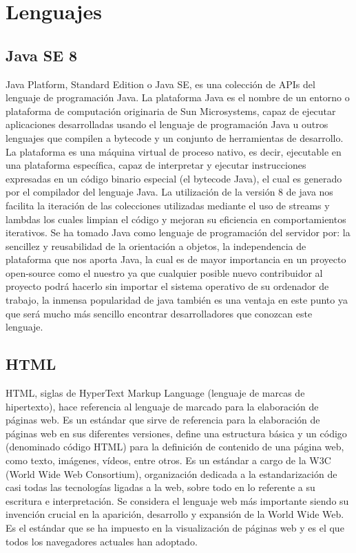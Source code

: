 \documentclass[12pt, a4paper, twoside]{book}
\begin{document}
	\section{Lenguajes}
	\subsection{Java SE 8}
	Java Platform, Standard Edition o Java SE, es una colección de APIs del lenguaje de
	programación Java. La plataforma Java es el nombre de un entorno o plataforma de computación
	originaria de Sun Microsystems, capaz de ejecutar aplicaciones desarrolladas usando el
	lenguaje de programación Java u outros lenguajes que compilen a bytecode y un conjunto
	de herramientas de desarrollo. La plataforma es una máquina virtual de proceso nativo, es decir, ejecutable en una plataforma específica, capaz de interpretar y ejecutar instrucciones expresadas en un código binario especial (el bytecode Java), el cual es generado por el compilador del lenguaje Java.\cite{Java}
	La utilización de la versión 8 de java nos facilita la iteración de las colecciones utilizadas mediante el uso de streams y lambdas los cuales limpian el código y mejoran su eficiencia en comportamientos iterativos.
	Se ha tomado Java como lenguaje de programación del servidor por: la sencillez y reusabilidad de la orientación a objetos, la independencia de plataforma que nos aporta Java, la cual es de mayor importancia en un proyecto open-source como el nuestro ya que cualquier posible nuevo contribuidor al proyecto podrá hacerlo sin importar el sistema operativo de su ordenador de trabajo, la inmensa popularidad de java también es una ventaja en este punto ya que será mucho más sencillo encontrar desarrolladores que conozcan este lenguaje.
	\subsection{HTML}
	HTML, siglas de HyperText Markup Language (lenguaje de marcas de
	hipertexto), hace referencia al lenguaje de marcado para la elaboración de páginas
	web. Es un estándar que sirve de referencia para la elaboración de páginas web
	en sus diferentes versiones, define una estructura básica y un código (denominado
	código HTML) para la definición de contenido de una página web, como texto,
	imágenes, vídeos, entre otros. Es un estándar a cargo de la W3C (World Wide
	Web Consortium), organización dedicada a la estandarización de casi todas
	las tecnologías ligadas a la web, sobre todo en lo referente a su escritura e
	interpretación. Se considera el lenguaje web más importante siendo su invención
	crucial en la aparición, desarrollo y expansión de la World Wide Web. Es el
	estándar que se ha impuesto en la visualización de páginas web y es el que todos
	los navegadores actuales han adoptado.\cite{HTML}
\end{document}
